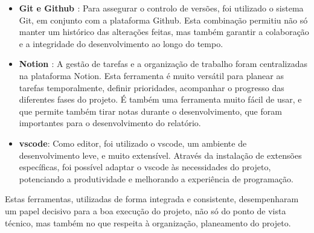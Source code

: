 \begin{itemize}
    \item \textbf{Git \cite{git} e Github \cite{github}}: Para assegurar o controlo de versões, foi utilizado o sistema Git, em conjunto com a plataforma Github. Esta combinação permitiu não só manter um histórico  das alterações feitas, mas também garantir a colaboração e a integridade do desenvolvimento ao longo do tempo.

    \item \textbf{Notion \cite{notion}}: A gestão de tarefas e a organização de trabalho foram centralizadas na plataforma Notion. Esta ferramenta é muito versátil para planear as tarefas temporalmente, definir prioridades, acompanhar o progresso das diferentes fases do projeto. É também uma ferramenta muito fácil de usar, e que permite também tirar notas durante o desenvolvimento, que foram importantes para o desenvolvimento do relatório.

    \item \textbf{\gls{vscode}\cite{vscode}}: Como editor, foi utilizado o \gls{vscode}, um ambiente de desenvolvimento  leve, e muito extensível. Através da instalação de extensões específicas, foi possível adaptar o \gls{vscode} às necessidades do projeto, potenciando a produtividade e melhorando a experiência de programação.
\end{itemize}

Estas ferramentas, utilizadas de forma integrada e consistente, desempenharam um papel decisivo para a boa execução do projeto, não só do ponto de vista técnico, mas também no que respeita à organização, planeamento do projeto.
